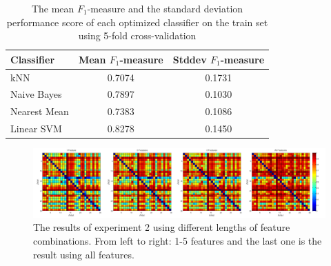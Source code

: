 
\begin{table}[htb]
    \centering
    \begin{tabular}
        { | l | c | c |} 
        \hline
        Classifier & Mean $F_1$-measure & Stddev $F_1$-measure  \\
        \hline
        kNN & 0.7074 & 0.1731 \\ 
        Naive Bayes & 0.7897 & 0.1030 \\ 
        Nearest Mean & 0.7383 & 0.1086 \\ 
        Linear SVM & 0.8278 & 0.1450 \\ 
        \hline 
    \end{tabular}
    \caption{The mean $F_1$-measure and the standard deviation performance score of each optimized classifier on the train set using 5-fold cross-validation}
    \label{ex2optimizeresults}
\end{table}


\begin{figure}[htb]
  \centering
  \includegraphics[width=1\linewidth]{img/experiment2results.png}
  \caption{The results of experiment 2 using different lengths of feature combinations. From left to right: 1-5 features and the last one is the result using all features.}
  \label{fig:experiment2results}
\end{figure}

